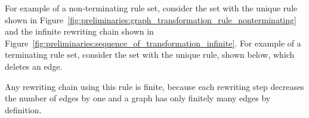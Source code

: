For example of a non-terminating rule set, consider the set with the unique rule shown in Figure~\ref{fig:preliminaries:graph_transformation_rule_nonterminating} and the infinite rewriting chain shown in Figure~\ref{fig:preliminaries:sequence_of_transformation_infinite}. 
For example of a terminating rule set, consider the set with the unique rule, shown below,
which deletes an edge. 
    \begin{center}
            \end{center}
Any rewriting chain using this rule is finite, because each rewriting step decreases the number of edges by one and a graph has only finitely many edges by definition.

